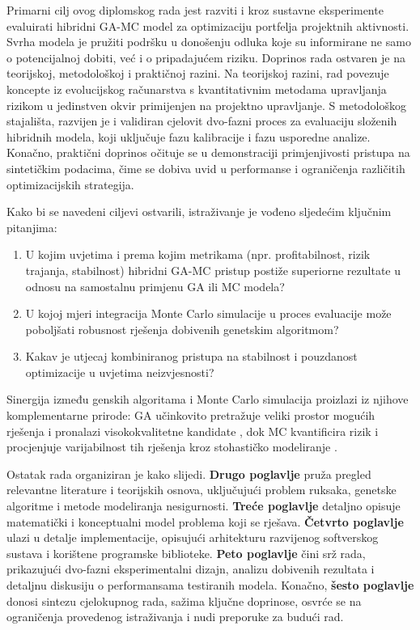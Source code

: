 Primarni cilj ovog diplomskog rada jest razviti i kroz sustavne eksperimente evaluirati hibridni GA-MC model za optimizaciju portfelja projektnih aktivnosti. Svrha modela je pružiti podršku u donošenju odluka koje su informirane ne samo o potencijalnoj dobiti, već i o pripadajućem riziku. Doprinos rada ostvaren je na teorijskoj, metodološkoj i praktičnoj razini. Na teorijskoj razini, rad povezuje koncepte iz evolucijskog računarstva s kvantitativnim metodama upravljanja rizikom u jedinstven okvir primijenjen na projektno upravljanje. S metodološkog stajališta, razvijen je i validiran cjelovit dvo-fazni proces za evaluaciju složenih hibridnih modela, koji uključuje fazu kalibracije i fazu usporedne analize. Konačno, praktični doprinos očituje se u demonstraciji primjenjivosti pristupa na sintetičkim podacima, čime se dobiva uvid u performanse i ograničenja različitih optimizacijskih strategija.

Kako bi se navedeni ciljevi ostvarili, istraživanje je vođeno sljedećim ključnim pitanjima:
\begin{enumerate}
\item U kojim uvjetima i prema kojim metrikama (npr. profitabilnost, rizik trajanja, stabilnost) hibridni GA-MC pristup postiže superiorne rezultate u odnosu na samostalnu primjenu GA ili MC modela?
\item U kojoj mjeri integracija Monte Carlo simulacije u proces evaluacije može poboljšati robusnost rješenja dobivenih genetskim algoritmom?
\item Kakav je utjecaj kombiniranog pristupa na stabilnost i pouzdanost optimizacije u uvjetima neizvjesnosti?
\end{enumerate}

Sinergija između genskih algoritama i Monte Carlo simulacija proizlazi iz njihove komplementarne prirode: GA učinkovito pretražuje veliki prostor mogućih rješenja i pronalazi visokokvalitetne kandidate \cite{Goldberg1989}, dok MC kvantificira rizik i procjenjuje varijabilnost tih rješenja kroz stohastičko modeliranje \cite{Rubinstein2016}.

Ostatak rada organiziran je kako slijedi. \textbf{Drugo poglavlje} pruža pregled relevantne literature i teorijskih osnova, uključujući problem ruksaka, genetske algoritme i metode modeliranja nesigurnosti. \textbf{Treće poglavlje} detaljno opisuje matematički i konceptualni model problema koji se rješava. \textbf{Četvrto poglavlje} ulazi u detalje implementacije, opisujući arhitekturu razvijenog softverskog sustava i korištene programske biblioteke. \textbf{Peto poglavlje} čini srž rada, prikazujući dvo-fazni eksperimentalni dizajn, analizu dobivenih rezultata i detaljnu diskusiju o performansama testiranih modela. Konačno, \textbf{šesto poglavlje} donosi sintezu cjelokupnog rada, sažima ključne doprinose, osvrće se na ograničenja provedenog istraživanja i nudi preporuke za budući rad.

